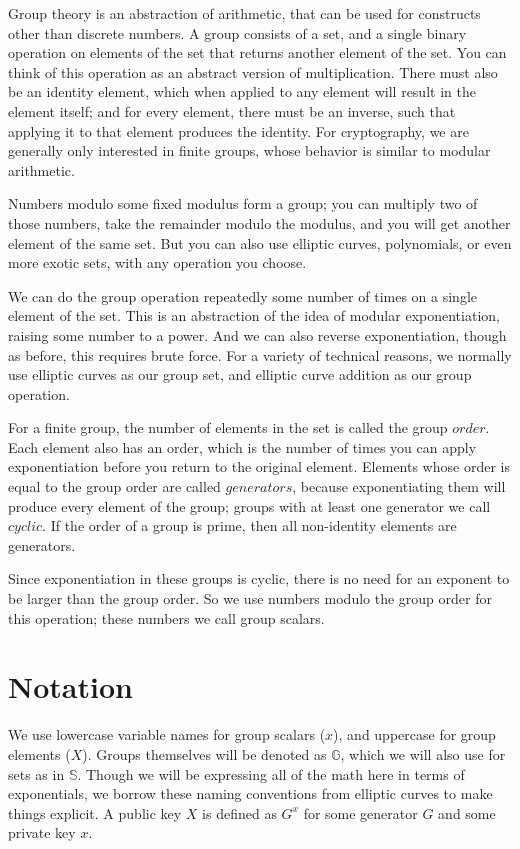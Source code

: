 \documentclass{article}
\begin{document}
Group theory is an abstraction of arithmetic, that can be used for constructs other than discrete numbers.  A group consists of a set, and a single binary operation on elements of the set that returns another element of the set. You can think of this operation as an abstract version of multiplication.  There must also be an identity element, which when applied to any element will result in the element itself; and for every element, there must be an inverse, such that applying it to that element produces the identity.  For cryptography, we are generally only interested in finite groups, whose behavior is similar to modular arithmetic.

Numbers modulo some fixed modulus form a group; you can multiply two of those numbers, take the remainder modulo the modulus, and you will get another element of the same set.  But you can also use elliptic curves, polynomials, or even more exotic sets, with any operation you choose.

We can do the group operation repeatedly some number of times on a single element of the set.  This is an abstraction of the idea of modular exponentiation, raising some number to a power.  And we can also reverse exponentiation, though as before, this requires brute force.  For a variety of technical reasons, we normally use elliptic curves as our group set, and elliptic curve addition as our group operation.

For a finite group, the number of elements in the set is called the group $order$.  Each element also has an order, which is the number of times you can apply exponentiation before you return to the original element.  Elements whose order is equal to the group order are called $generators$, because exponentiating them will produce every element of the group; groups with at least one generator we call $cyclic$.  If the order of a group is prime, then all non-identity elements are generators.

Since exponentiation in these groups is cyclic, there is no need for an exponent to be larger than the group order.  So we use numbers modulo the group order for this operation; these numbers we call group scalars.


\newpage
\section{
  Notation
}

We use lowercase variable names for group scalars ($x$), and uppercase for group elements ($X$).  Groups themselves will be denoted as $\mathbb{G}$, which we will also use for sets as in $\mathbb{S}$.  Though we will be expressing all of the math here in terms of exponentials, we borrow these naming conventions from elliptic curves to make things explicit.  A public key $X$ is defined as $G^x$ for some generator $G$ and some private key $x$.
\end{document}
